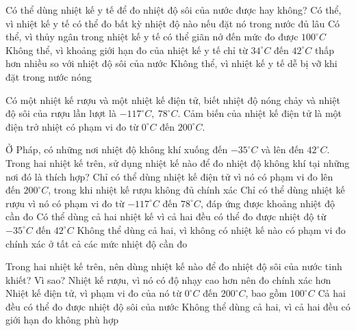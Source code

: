 \begin{ex} 
	Có thể dùng nhiệt kế y tế để đo nhiệt độ sôi của nước được hay không?
	\choice
	{Có thể, vì nhiệt kế y tế có thể đo bất kỳ nhiệt độ nào nếu đặt nó trong nước đủ lâu}
	{Có thể, vì thủy ngân trong nhiệt kế y tế có thể giãn nở đến mức đo được $100^\circ C$}
	{\True Không thể, vì khoảng giới hạn đo của nhiệt kế y tế chỉ từ $34^\circ C$ đến $42^\circ C$ thấp hơn nhiều so với nhiệt độ sôi của nước}
	{Không thể, vì nhiệt kế y tế dễ bị vỡ khi đặt trong nước nóng}
\end{ex}
\begin{ex}
	Có một nhiệt kế rượu và một nhiệt kế điện tử, biết nhiệt độ nóng chảy và nhiệt độ sôi của rượu lần lượt là $-117^{\circ} C,\ 78^{\circ} C$. Cảm biến của nhiệt kế điện tử là một điện trở nhiệt có phạm vi đo từ $0^{\circ} C$ đến $200^{\circ} C$.
	\begin{chc}
		Ở Pháp, có những nơi nhiệt độ không khí xuống đến $-35^{\circ} C$ và lên đến $42^{\circ} C$. Trong hai nhiệt kế trên, sử dụng nhiệt kế nào để đo nhiệt độ không khí tại những nơi đó là thích hợp?
		\choice
		{Chỉ có thể dùng nhiệt kế điện tử vì nó có phạm vi đo lên đến $200^\circ C$, trong khi nhiệt kế rượu không đủ chính xác}
		{\True Chỉ có thể dùng nhiệt kế rượu vì nó có phạm vi đo từ $-117^\circ C$ đến $78^\circ C$, đáp ứng được khoảng nhiệt độ cần đo}
		{Có thể dùng cả hai nhiệt kế vì cả hai đều có thể đo được nhiệt độ từ $-35^\circ C$ đến $42^\circ C$}
		{Không thể dùng cả hai, vì không có nhiệt kế nào có phạm vi đo chính xác ở tất cả các mức nhiệt độ cần đo}
	\end{chc}
	\begin{chc}
		Trong hai nhiệt kế trên, nên dùng nhiệt kế nào để đo nhiệt độ sôi của nước tinh khiết? Vì sao?
		\choice
		{Nhiệt kế rượu, vì nó có độ nhạy cao hơn nên đo chính xác hơn}
		{\True Nhiệt kế điện tử, vì phạm vi đo của nó từ $0^{\circ} C$ đến $200^{\circ} C$, bao gồm $100^{\circ} C$}
		{Cả hai đều có thể đo được nhiệt độ sôi của nước}
		{Không thể dùng cả hai, vì cả hai đều có giới hạn đo không phù hợp}
	\end{chc}
\end{ex}
